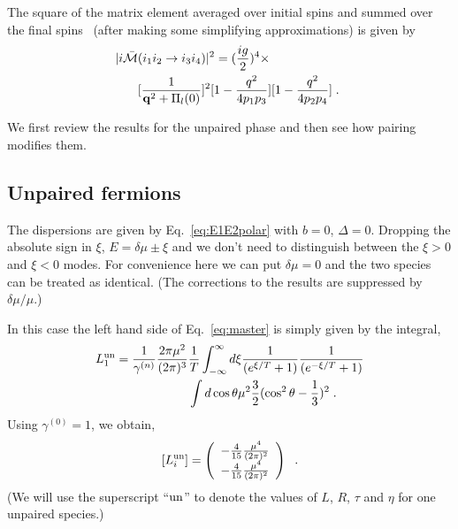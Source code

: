 \documentclass[10pt, aps, prd, superscriptaddress, nofootinbib, 
               amsmath, amssymb, twocolumn,
               preprintnumbers, showpacs,
               raggedbottom,
               floatfix]{revtex4-1}
\newcommand{\bfq}{{\bf{q}}}
\newcommand{\un}{{\rm{un}}}
\begin{document}
The square of the matrix element averaged over initial spins and summed over
the final spins~\cite{Alford:2014doa} (after making some simplifying
approximations) is given by 
\begin{equation}
\begin{split}
|i\bar{\cal{M}}&(i_1i_2\rightarrow i_3i_4)|^2 
= (\frac{ig}{2})^4\times\\
&
[\frac{1}{\bfq^2+\Pi_l(0)}]^2[1-\frac{q^2}{4p_1p_3}][1-\frac{q^2}{4p_2p_4}]\;.
~\label{eq:M2_8_unp}
\end{split}
\end{equation}

We first review the results for the unpaired phase and then see how pairing
modifies them.

\subsection{Unpaired fermions}
\label{subsec:Unpaired}
The dispersions are given by Eq.~\ref{eq:E1E2polar} with $b=0$, $\Delta=0$.
Dropping the absolute sign in $\xi$, $E=\delta\mu\pm\xi$ and we don't need to
distinguish between the $\xi>0$ and $\xi<0$ modes. For convenience here we can
put $\delta\mu=0$ and the two species can be treated as identical. (The
corrections to the results are suppressed by $\delta\mu/\mu$.) 

In this case the left hand side of Eq.~\ref{eq:master} is simply given by the
integral,
\begin{equation}
\begin{split}
L_1^\un =  
\frac{1}{\gamma^{(n)}} \frac{2\pi\mu^2}{(2\pi)^3}
&\frac{1}{T}\int_{-\infty}^{\infty} d\xi
\frac{1}{(e^{\xi/T}+1)}\frac{1}{(e^{-\xi/T}+1)}\\ 
&\int d\cos\theta \mu^2 \frac{3}{2}(\cos^2\theta-\frac{1}{3})^2\;.
\end{split}
\end{equation}
Using $\gamma^{(0)}=1$, we obtain,
\begin{equation}
\begin{split}
[L_i^\un] =  \left(\begin{array}{c} 
-\frac{4}{15}\frac{\mu^4}{(2\pi)^2}\\
-\frac{4}{15}\frac{\mu^4}{(2\pi)^2}\end{array}
\right)~\label{eq:Liunpaired}\;.
\end{split}
\end{equation}
(We will use the superscript ``$\un$'' to denote the values of $L$, $R$, $\tau$ and
$\eta$ for one unpaired species.)
\end{document}
